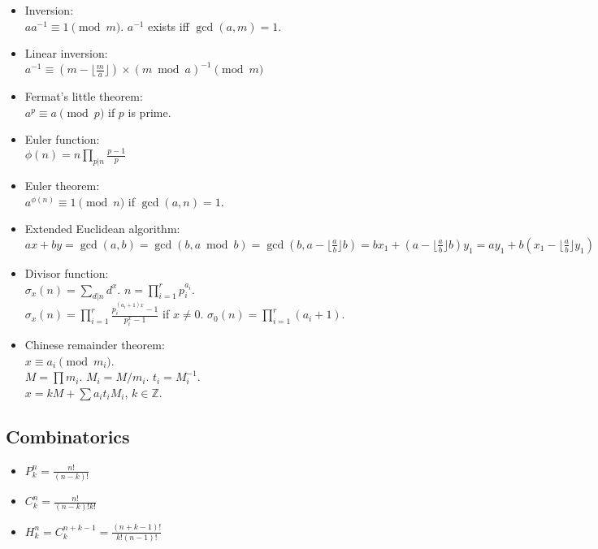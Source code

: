 \documentclass[twocolumn]{article}
\begin{document}
\begin{itemize}
    \item Inversion:\\ $aa^{-1} \equiv 1 \pmod{m}$. $a^{-1}$ exists iff $\gcd(a,m)=1$.
    \item Linear inversion:\\ $a^{-1} \equiv (m - \lfloor\frac{m}{a}\rfloor) \times (m \bmod a)^{-1} \pmod{m}$
    \item Fermat's little theorem:\\ $a^p \equiv a \pmod{p}$ if $p$ is prime.
    \item Euler function:\\ $\phi(n)=n \prod_{p|n} \frac{p-1}{p}$
    \item Euler theorem:\\ $a^{\phi(n)} \equiv 1 \pmod{n}$ if $\gcd(a,n) = 1$.
    \item Extended Euclidean algorithm:\\
    $ax+by=\gcd(a,b)=\gcd(b, a \bmod b)=\gcd(b, a-\lfloor\frac{a}{b}\rfloor b)=bx_1+(a-\lfloor\frac{a}{b}\rfloor b)y_1=ay_1+b(x_1-\lfloor\frac{a}{b}\rfloor y_1)$
    \item Divisor function:\\ $\sigma_x(n) = \sum_{d|n}d^x$. $n=\prod_{i=1}^r p_i^{a_i}$.\\ $\sigma_x(n)=\prod_{i=1}^r \frac{p_i^{(a_i+1)x}-1}{p_i^x-1}$ if $x \neq 0$. $\sigma_0(n)=\prod_{i=1}^r (a_i+1)$.
    \item Chinese remainder theorem:\\ $x \equiv a_i \pmod{m_i}$.\\
        $M=\prod m_i$. $M_i=M/m_i$. $t_i=M_i^{-1}$.\\
        $x = kM + \sum a_i t_i M_i$, $k \in \mathbb{Z}$.
\end{itemize}

\subsection{Combinatorics}

\begin{itemize}
    \item $P^n_k=\frac{n!}{(n-k)!}$
    \item $C^n_k=\frac{n!}{(n-k)!k!}$
    \item $H^n_k=C^{n+k-1}_k=\frac{(n+k-1)!}{k!(n-1)!}$
\end{itemize}
\end{document}
